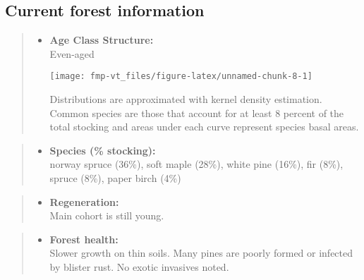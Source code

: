 \documentclass[]{tufte-handout}
\providecommand{\tightlist}{%
  \setlength{\itemsep}{0pt}\setlength{\parskip}{0pt}}
\begin{document}
\subsection{Current forest
information}\label{current-forest-information-1}

\begin{quote}
\begin{itemize}
\tightlist
\item
  \textbf{Age Class Structure:}\\
  \vspace{2pt} Even-aged\\

  \begin{marginfigure}
  \texttt{[image: fmp-vt\_files/figure-latex/unnamed-chunk-8-1]} \caption[Distributions are approximated with kernel density estimation]{Distributions are approximated with kernel density estimation. Common species are those that account for at least 8 percent of the total stocking and areas under each curve represent species basal areas.}\label{fig:unnamed-chunk-8}
  \end{marginfigure}
\end{itemize}
\end{quote}

\begin{quote}
\begin{itemize}
\tightlist
\item
  \textbf{Species (\% stocking):}\\
  \vspace{2pt} norway spruce (36\%), soft maple (28\%), white pine
  (16\%), fir (8\%), spruce (8\%), paper birch (4\%)
\end{itemize}
\end{quote}

\begin{quote}
\begin{itemize}
\tightlist
\item
  \textbf{Regeneration:}\\
  \vspace{2pt} Main cohort is still young.
\end{itemize}
\end{quote}

\begin{quote}
\begin{itemize}
\tightlist
\item
  \textbf{Forest health:}\\
  \vspace{2pt} Slower growth on thin soils. Many pines are poorly formed
  or infected by blister rust. No exotic invasives noted.
\end{itemize}
\end{quote}
\end{document}
